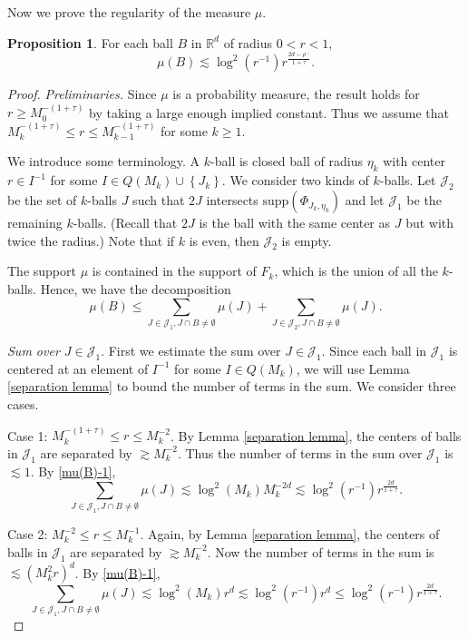 \documentclass{amsart}
\numberwithin{equation}{section}
\theoremstyle{definition}
\newtheorem{prop}[theorem]{Proposition}
\theoremstyle{definition}
\def\RR{\mathbb{R}}
\def\supp{\mathrm{supp}}
\newcommand{\cbr}[1]{ \left\{ {#1} \right\} }
\begin{document}
Now we prove the regularity of the measure $\mu$. 




\begin{prop}\label{Prop_mu_reg}
For each ball $B$ in $\RR^d$ of radius $0 < r < 1$,
\begin{equation*}
\mu(B) \lesssim 
\log^2(r^{-1})r^{\frac{2d-\rho^-}{1+\tau}}.
\end{equation*}
\end{prop}



\begin{proof}
\textit{Preliminaries.} Since $\mu$ is a probability measure, the result holds for $r \geq M_0^{-(1+\tau)}$ by taking a large enough implied constant. 
Thus we assume that $M_k^{-(1+\tau)} \leq r \leq M_{k-1}^{-(1+\tau)}$ for some $k \geq 1$. 

We introduce some terminology. 
A $k$-ball is closed ball of radius $\eta_k$ with center $r \in I^{-1}$ for some $I \in Q(M_k) \cup \cbr{J_k}$. 
We consider two kinds of $k$-balls. 
Let $\mathcal{J}_2$ be the set of $k$-balls $J$ such that $2J$ intersects $\supp(\Phi_{J_k,\eta_k})$ and let $\mathcal{J}_1$ be the remaining $k$-balls. (Recall that $2J$ is the ball with the same center as $J$ but with twice the radius.) Note that if $k$ is even, then $\mathcal{J}_2$ is empty. 

The support $\mu$ is contained in the support of $F_k$, which is the union of all the $k$-balls. 
Hence, we have the decomposition
$$
\mu(B) \leq \sum_{J \in \mathcal{J}_1, J \cap B \neq \emptyset} \mu(J) +\sum_{J \in \mathcal{J}_2, J \cap B \neq \emptyset} \mu(J).
$$

\textit{Sum over $J \in \mathcal{J}_1.$} 
First we estimate the sum over $J \in \mathcal{J}_1$. 
Since each ball in $\mathcal{J}_1$ is centered at an element of $I^{-1}$ for some $I \in Q(M_k)$, we will use Lemma \ref{separation lemma} to bound the number of terms in the sum. 
We consider three cases. 

Case 1: $M_k^{-(1+\tau)} \leq r \leq M_k^{-2} $. 
By Lemma \ref{separation lemma}, the centers of balls in $\mathcal{J}_1$ are separated by $\gtrsim M_k^{-2}$. 
Thus the number of terms in the sum over $\mathcal{J}_1$ is $\lesssim 1$. By \eqref{mu(B)-1}, 
$$
\sum_{J \in \mathcal{J}_1, J \cap B \neq \emptyset} \mu(J) 
\lesssim \log^2(M_k) M_k^{-2d} \lesssim \log^2(r^{-1}) r^{\frac{2d}{1+\tau}}.
$$

Case 2: $M_k^{-2} \leq r \leq M_k^{-1} $. Again, by Lemma \ref{separation lemma}, the centers of balls in $\mathcal{J}_1$ are separated by $\gtrsim M_k^{-2}$. Now the number of terms in the sum is $\lesssim (M_k^2r)^d$. By \eqref{mu(B)-1}, 
$$
\sum_{J \in \mathcal{J}_1, J \cap B \neq \emptyset} \mu(J) 
\lesssim \log^2(M_k) r^d \lesssim \log^2(r^{-1}) r^d \leq \log^2(r^{-1}) r^{\frac{2d}{1+\tau}}. 
$$


\end{proof}
\end{document}

